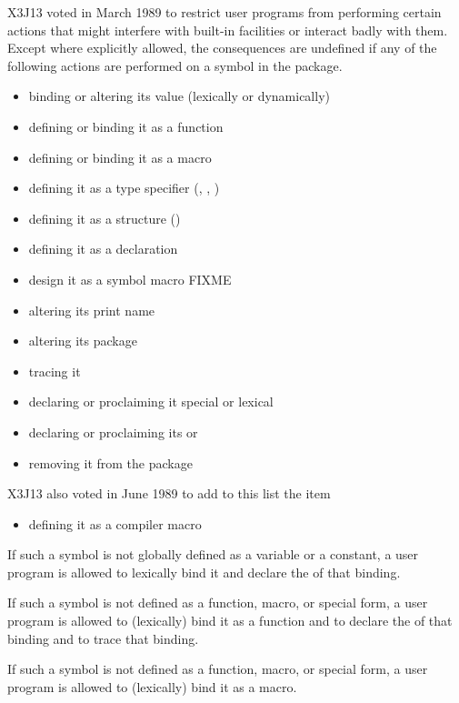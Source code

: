\begin{newer}
X3J13 voted in March 1989 
to restrict user programs from performing certain actions that
might interfere with built-in facilities or interact badly
with them.
Except where explicitly allowed, the consequences are undefined if any
of the following actions are performed on a symbol in the 
package.
\begin{itemize}
\item binding or altering its value (lexically or dynamically)
\item defining or binding it as a function
\item defining or binding it as a macro
\item defining it as a type specifier (, , )
\item defining it as a structure ()
\item defining it as a declaration
\item design it as a symbol macro FIXME
\item altering its print name
\item altering its package
\item tracing it
\item declaring or proclaiming it special or lexical
\item declaring or proclaiming its  or 
\item removing it from the package 
\end{itemize}
X3J13 also voted in June 1989 
to add to this list the item
\begin{itemize}
\item defining it as a compiler macro
\end{itemize}

If such a symbol is not globally defined as a variable or a constant,
a user program is allowed to lexically bind it and declare the  of
that binding.

If such a symbol is not defined as a function, macro, or special form,
a user program is allowed to (lexically) bind it as a function and to declare the
 of that binding and to trace that binding.

If such a symbol is not defined as a function, macro, or special form,
a user program is allowed to (lexically) bind it as a macro.


\end{newer}
